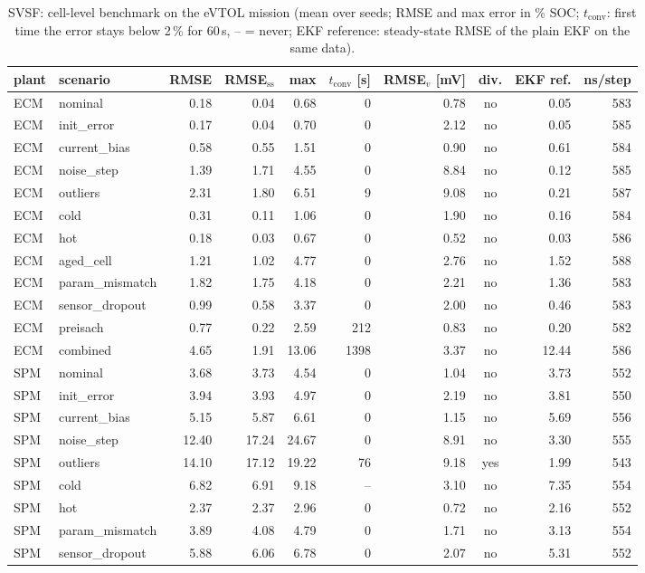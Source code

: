 \begin{table}[H]\centering\footnotesize\setlength{\tabcolsep}{4pt}
\caption{SVSF: cell-level benchmark on the eVTOL mission (mean over seeds; RMSE and max error in \% SOC; $t_\mathrm{conv}$: first time the error stays below 2\,\% for 60\,s, -- = never; EKF reference: steady-state RMSE of the plain EKF on the same data).}\label{tab:cell_SVSF}
\begin{tabular}{llrrrrrcrr}\toprule
plant & scenario & RMSE & RMSE$_\mathrm{ss}$ & max & $t_\mathrm{conv}$ [s] & RMSE$_v$ [mV] & div. & EKF ref. & ns/step \\ \midrule
ECM & nominal & 0.18 & 0.04 & 0.68 & 0 & 0.78 & no & 0.05 & 583 \\
ECM & init\_error & 0.17 & 0.04 & 0.70 & 0 & 2.12 & no & 0.05 & 585 \\
ECM & current\_bias & 0.58 & 0.55 & 1.51 & 0 & 0.90 & no & 0.61 & 584 \\
ECM & noise\_step & 1.39 & 1.71 & 4.55 & 0 & 8.84 & no & 0.12 & 585 \\
ECM & outliers & 2.31 & 1.80 & 6.51 & 9 & 9.08 & no & 0.21 & 587 \\
ECM & cold & 0.31 & 0.11 & 1.06 & 0 & 1.90 & no & 0.16 & 584 \\
ECM & hot & 0.18 & 0.03 & 0.67 & 0 & 0.52 & no & 0.03 & 586 \\
ECM & aged\_cell & 1.21 & 1.02 & 4.77 & 0 & 2.76 & no & 1.52 & 588 \\
ECM & param\_mismatch & 1.82 & 1.75 & 4.18 & 0 & 2.21 & no & 1.36 & 583 \\
ECM & sensor\_dropout & 0.99 & 0.58 & 3.37 & 0 & 2.00 & no & 0.46 & 583 \\
ECM & preisach & 0.77 & 0.22 & 2.59 & 212 & 0.83 & no & 0.20 & 582 \\
ECM & combined & 4.65 & 1.91 & 13.06 & 1398 & 3.37 & no & 12.44 & 586 \\
\midrule
SPM & nominal & 3.68 & 3.73 & 4.54 & 0 & 1.04 & no & 3.73 & 552 \\
SPM & init\_error & 3.94 & 3.93 & 4.97 & 0 & 2.19 & no & 3.81 & 550 \\
SPM & current\_bias & 5.15 & 5.87 & 6.61 & 0 & 1.15 & no & 5.69 & 556 \\
SPM & noise\_step & 12.40 & 17.24 & 24.67 & 0 & 8.91 & no & 3.30 & 555 \\
SPM & outliers & 14.10 & 17.12 & 19.22 & 76 & 9.18 & yes & 1.99 & 543 \\
SPM & cold & 6.82 & 6.91 & 9.18 & -- & 3.10 & no & 7.35 & 554 \\
SPM & hot & 2.37 & 2.37 & 2.96 & 0 & 0.72 & no & 2.16 & 552 \\
SPM & param\_mismatch & 3.89 & 4.08 & 4.79 & 0 & 1.71 & no & 3.13 & 554 \\
SPM & sensor\_dropout & 5.88 & 6.06 & 6.78 & 0 & 2.07 & no & 5.31 & 552 \\
\bottomrule\end{tabular}\end{table}
